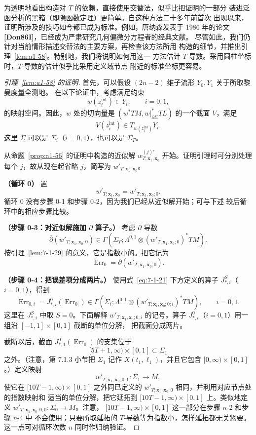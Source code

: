 为透明地看出构造对 $T$ 的依赖，直接使用交替法，似乎比把证明的一部分
装进泛函分析的黑箱（即隐函数定理）更简单。自这种方法二十多年前首次
出现以来，证明所涉及的技巧如今都已成为标准。例如，唐纳森发表于 1986
年的论文 \textbf{[Don86I]}，已经成为严肃研究几何偏微分方程者的经典文献。
尽管如此，我们仍针对当前情形描述交替法的主要方案，再检查该方法所用
构造的细节，并推出引理~\ref{lem:a1-58}。特别地，我们将说明如何用这一
方法估计 $T$-导数。采用圆柱坐标时，$T$-导数的估计似乎比采用定义域节点
附近的标准坐标更容易。

\begin{proof}[引理~\ref{lem:a1-58} 的证明]
首先，可以假设 $(2n-2)$ 维子流形 $Y_0,Y_1$ 关于所取黎曼度量全测地。
在以下论证中，考虑满足约束
\[
 w(z_i^{\mathrm{int}})\in Y_i,
 \qquad i=0,1,
\]
的映射空间。因此，$w$ 处的切向量是
$(w^*TM,w|_{\partial\Sigma}^*TL)$ 的一个截面 $V$，满足
\[
 V(z_i^{\mathrm{int}})
 \in T_{w(z_i^{\mathrm{int}})}Y_i.
\]
这里 $\Sigma$ 可以是 $\Sigma_i$（$i=0,1$），也可以是 $\Sigma_T$。

从命题~\ref{prop:a1-56} 的证明中构造的近似解
$w_{T;\mathbf x_1,\mathbf x_0}^{(j)\prime}$ 开始。证明引理时可分别处理
每个 $j$，故从现在起省略 $j$，简写为
$w'_{T;\mathbf x_1,\mathbf x_0}$。

\medskip\noindent\textbf{（循环 0）}
置
\[
 w'_{T;\mathbf x_1,\mathbf x_0}
 =w'_{T;\mathbf x_1,\mathbf x_0;0}.
\]
循环 0 没有步骤 0-1 和步骤 0-2，因为我们已经从近似解开始；可与下述
较后循环中的相应步骤比较。

\smallskip\noindent\textbf{（步骤 0-3：对近似解施加
$\bar\partial$ 算子。）}
考虑 $\bar\partial$ 导数
\[
 \bar\partial(w'_{T;\mathbf x_1,\mathbf x_0;0})
 \in
 \Gamma\!\left(
 \Sigma_T;
 \Lambda^{0,1}\otimes
 (w'_{T;\mathbf x_1,\mathbf x_0;0})^*TM
 \right).
\]
按引理~\ref{lem:7-1-29} 的意义，它是指数小的。把它记为
\[
 \operatorname{Err}_0
 =\bar\partial(w'_{T;\mathbf x_1,\mathbf x_0;0}).
\]

\smallskip\noindent\textbf{（步骤 0-4：把误差项分成两片。）}
使用式~\eqref{eq:7-1-21} 下方定义的算子
$J^S_{*,i}$（$i=0,1$），得到
\[
 \operatorname{Err}_{0,i}
 =J^0_{*,i}(\operatorname{Err}_0)
 \in
 \Gamma\!\left(
 \Sigma_i;\Lambda^{0,1}\otimes
 (w'_{T;\mathbf x_1,\mathbf x_0;0;i})^*TM
 \right),
 \qquad i=0,1.
\]
这里在 $J^S_{*,i}$ 中取 $S=0$。下面解释
$w'_{T;\mathbf x_1,\mathbf x_0;0;i}$ 的记号。算子
$J^0_{*,i}$（$i=0,1$）用一组沿 $[-1,1]\times[0,1]$ 截断的单位分解，
把截面分成两片。

截断以后，截面 $J^0_{*,1}(\operatorname{Err}_0)$ 的支集位于
\[
 [5T+1,\infty)\times[0,1]\subset\Sigma_1
\]
之外。（注意，第 7.1.3 小节把 $\Sigma_1$ 记作
$X(t_1,\ell_1)$，并且它包含 $[0,\infty)\times[0,1]$。）定义映射
\[
 w'_{T;\mathbf x_1,\mathbf x_0;0;1}\colon\Sigma_1\longrightarrow M,
\]
使它在 $[10T-1,\infty)\times[0,1]$ 之外同已定义的
$w'_{T;\mathbf x_1,\mathbf x_0;0}$ 相同，并利用对应节点处的指数映射和
适当的单位分解，把它延拓到
$[10T-1,\infty)\times[0,1]$ 上。类似地定义
$w'_{T;\mathbf x_1,\mathbf x_0;0;0}\colon\Sigma_0\to M$。注意，
$[10T-1,\infty)\times[0,1]$ 这一部分在步骤 $n$-2 和步骤 $n$-4 中
不会使用；只要所取延拓的 $T$-导数等为指数小，怎样延拓都无关紧要。
这一点可对循环次数 $n$ 同时作归纳验证。


\end{proof}
